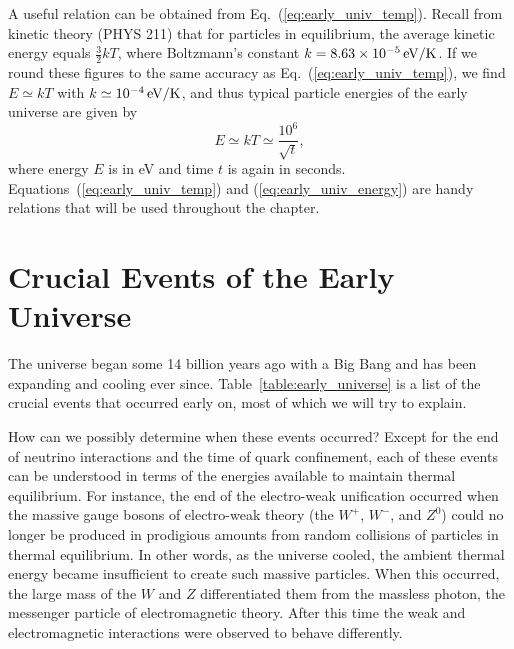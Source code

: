A useful relation can be obtained from Eq.~(\ref{eq:early_univ_temp}).
Recall from kinetic theory (PHYS 211) that for particles in
equilibrium, the average kinetic energy equals $\frac{3}{2}kT$, where
Boltzmann's constant $k= 8.63\times 10^{-5}\,\mbox{eV/K}$.  If we round these
figures to the same accuracy as Eq.~(\ref{eq:early_univ_temp}), we
find $E \simeq kT$ with $k \simeq 10^{-4}\,\mbox{eV/K}$, and thus typical
particle energies of the early universe are given by
\begin{equation}
\label{eq:early_univ_energy}
E \simeq kT \simeq \frac{10^6}{\sqrt t},
\end{equation}
where energy $E$ is in eV and time $t$ is again in seconds.
Equations~(\ref{eq:early_univ_temp}) and (\ref{eq:early_univ_energy})
are handy relations that will be used throughout the chapter.

\section{Crucial Events of the Early Universe}
\label{section:crucial_events}

The universe began some 14 billion years ago with a Big Bang and
has been expanding and cooling ever
since. Table~\ref{table:early_universe} is a list of the crucial
events that occurred early on, most of which we will try to explain.

How can we possibly determine when these events occurred? Except for
the end of neutrino interactions and the time of quark confinement,
each of these events can be understood in terms of the energies
available to maintain thermal equilibrium.  For instance, the end of
the electro-weak unification occurred when the massive gauge bosons of
electro-weak theory (the $W^+$, $W^-$, and $Z^0$) could no longer be
produced in prodigious amounts from random collisions of particles in
thermal equilibrium.  In other words, as the universe cooled, the
ambient thermal energy became insufficient to create such massive
particles.  When this occurred, the large mass of the $W$ and $Z$
differentiated them from the massless photon, the messenger particle
of electromagnetic theory.  After this time the weak and
electromagnetic interactions were observed to behave differently.


